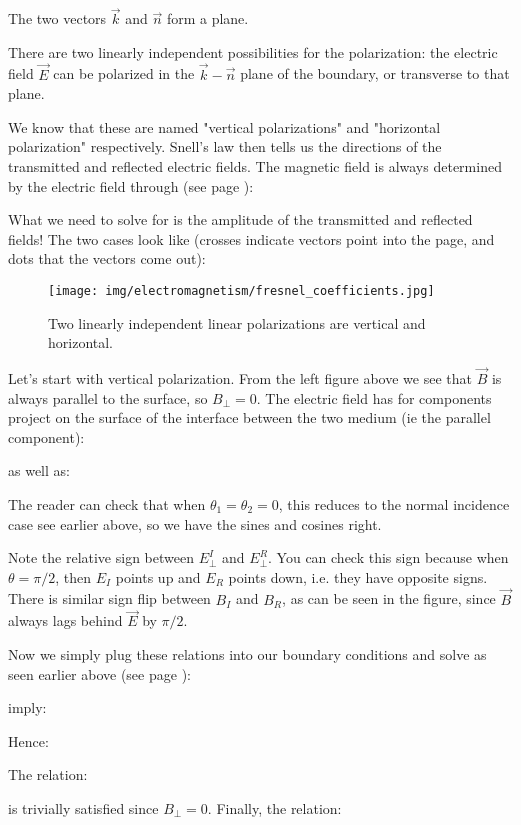 	The two vectors $\vec{k}$ and $\vec{n}$ form a plane. 
	
	There are two linearly independent possibilities for the polarization: the electric field $\vec{E}$ can be polarized in the $\vec{k}-\vec{n}$ plane of the boundary, or transverse to that plane. 
	
	We know that these are named "vertical polarizations" and "horizontal polarization" respectively. Snell's law then tells us the directions of the transmitted and reflected electric fields. The magnetic field is always determined by the electric field through (see page \pageref{wave equation by wave vector}):
	
	What we need to solve for is the amplitude of the transmitted and reflected fields! The two cases look like (crosses indicate vectors point into the page, and dots that the vectors come out):
	\begin{figure}[H]
		\centering
		\texttt{[image: img/electromagnetism/fresnel\_coefficients.jpg]}
		\caption[]{Two linearly independent linear polarizations are vertical and horizontal.}
		\label{fig:fresnel coefficients}
	\end{figure}
	Let's start with vertical polarization. From the left figure above we see that $\vec{B}$ is always parallel to the surface, so $B_{\perp}=0$. The electric field has for components project on the surface of the interface between the two medium (ie the parallel component):
	
	as well as:
	
	The reader can check that when $\theta_{1}=\theta_{2}=0$, this reduces to the normal incidence case see earlier above, so we have the sines and cosines right. 
	
	
	Note the relative sign between $E_{\perp}^{I}$ and $E_{\perp}^{R}$. You can check this sign because when $\theta=\pi/2$, then $E_{I}$ points up and $E_{R}$ points down, i.e. they have opposite signs. There is similar sign flip between $B_{I}$ and $B_{R}$, as can be seen in the figure, since $\vec{B}$ always lags behind $\vec{E}$ by $\pi/2$. 
	
	Now we simply plug these relations into our boundary conditions and solve as seen earlier above (see page \pageref{boundary condition for refraction}):
	
	imply:
	
	Hence:
	
	The relation:
	
	is trivially satisfied since $B_{\perp}=0$. Finally, the relation:
	

